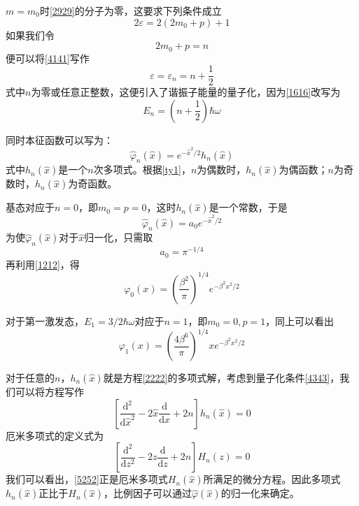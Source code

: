 \documentclass[]{article}
\begin{document}
$m=m_0$时\eqref{2929}的分子为零，这要求下列条件成立
\begin{equation}
	2\varepsilon=2(2m_0+p)+1
	\label{4141}
\end{equation}
如果我们令
\begin{equation}
	2m_0+p=n
\end{equation}
便可以将\eqref{4141}写作
\begin{equation}
	\varepsilon=\varepsilon_n=n+\dfrac{1}{2}
	\label{4343}
\end{equation}
式中$n$为零或任意正整数，这便引入了谐振子能量的量子化，因为\eqref{1616}改写为
\begin{equation}
	E_n=\left(n+\dfrac{1}{2} \right)\hbar\omega 
\end{equation}

同时本征函数可以写为：
\begin{equation}
	\widehat{\varphi}_n(\widehat{x})=e^{-\widehat{x}^2/2}h_n(\widehat{x})
\end{equation}
式中$h_n(\widehat{x})$是一个$n$次多项式。根据\eqref{ty1}，$n$为偶数时，$h_n(\widehat{x})$为偶函数；$n$为奇数时，$h_n(\widehat{x})$为奇函数。\par 
基态对应于$n=0$，即$m_0=p=0$，这时$h_n(\widehat{x})$是一个常数，于是
\begin{equation}
	\widehat{\varphi}_n(\widehat{x})=a_0e^{-\widehat{x}^2/2}
\end{equation}
为使$\widehat{\varphi}_n(\widehat{x})$对于$\widehat{x}$归一化，只需取
\begin{equation}
	a_0=\pi^{-1/4}
\end{equation}
再利用\eqref{1212}，得
\begin{equation}
	\varphi_0(x)=\left( \dfrac{\beta^2}{\pi}\right)^{1/4}e^{-\beta^2x^2/2} 
\end{equation}

对于第一激发态，$E_1=3/2\hbar\omega$对应于$n=1$，即$m_0=0,p=1$，同上可以看出
\begin{equation}
	\varphi_1(x)=\left( \dfrac{4\beta^6}{\pi}\right)^{1/4}xe^{-\beta^2x^2/2}
\end{equation}

对于任意的$n$，$h_n(\widehat{x})$就是方程\eqref{2222}的多项式解，考虑到量子化条件\eqref{4343}，我们可以将方程写作
\begin{equation}
	\left[ \dfrac{\mathrm{d}^2}{\mathrm{d}\widehat{x}^2}-2\widehat{x}\dfrac{\mathrm{d}}{\mathrm{d}\widehat{x}}+2n\right] h_n(\widehat{x})=0
	\label{5252}
\end{equation}
厄米多项式的定义式为
\begin{equation}
	\left[ \dfrac{\mathrm{d}^2}{\mathrm{d}z^2}-2z\dfrac{\mathrm{d}}{\mathrm{d}z}+2n\right] H_n(z)=0
\end{equation}
我们可以看出，\eqref{5252}正是厄米多项式$H_n(\widehat{x})$所满足的微分方程。因此多项式$h_n(\widehat{x})$正比于$H_n(\widehat{x})$，比例因子可以通过$\widehat{\varphi}(\widehat{x})$的归一化来确定。
\end{document}

